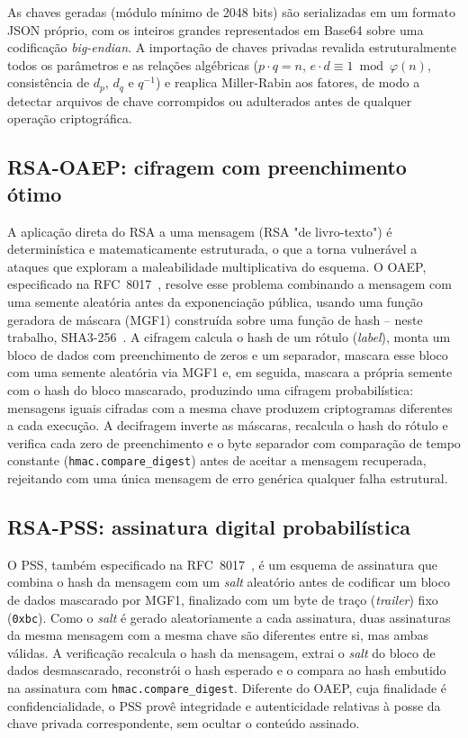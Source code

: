 \documentclass[conference]{IEEEtran}
\begin{document}
As chaves geradas (módulo mínimo de 2048 bits) são serializadas em um formato JSON próprio,
com os inteiros grandes representados em Base64 sobre uma codificação \textit{big-endian}. A
importação de chaves privadas revalida estruturalmente todos os parâmetros e as relações
algébricas ($p \cdot q = n$, $e \cdot d \equiv 1 \bmod \varphi(n)$, consistência de $d_p$,
$d_q$ e $q^{-1}$) e reaplica Miller-Rabin aos fatores, de modo a detectar arquivos de chave
corrompidos ou adulterados antes de qualquer operação criptográfica.

\subsection{RSA-OAEP: cifragem com preenchimento ótimo}

A aplicação direta do RSA a uma mensagem (RSA "de livro-texto") é determinística e
matematicamente estruturada, o que a torna vulnerável a ataques que exploram a maleabilidade
multiplicativa do esquema. O OAEP, especificado na RFC~8017~\cite{rfc8017}, resolve esse
problema combinando a mensagem com uma semente aleatória antes da exponenciação pública,
usando uma função geradora de máscara (MGF1) construída sobre uma função de hash -- neste
trabalho, SHA3-256~\cite{fips202}. A cifragem calcula o hash de um rótulo (\textit{label}),
monta um bloco de dados com preenchimento de zeros e um separador, mascara esse bloco com uma
semente aleatória via MGF1 e, em seguida, mascara a própria semente com o hash do bloco
mascarado, produzindo uma cifragem probabilística: mensagens iguais cifradas com a mesma chave
produzem criptogramas diferentes a cada execução. A decifragem inverte as máscaras, recalcula
o hash do rótulo e verifica cada zero de preenchimento e o byte separador com comparação de
tempo constante (\texttt{hmac.compare\_digest}) antes de aceitar a mensagem recuperada,
rejeitando com uma única mensagem de erro genérica qualquer falha estrutural.

\subsection{RSA-PSS: assinatura digital probabilística}

O PSS, também especificado na RFC~8017~\cite{rfc8017}, é um esquema de assinatura que combina
o hash da mensagem com um \textit{salt} aleatório antes de codificar um bloco de dados
mascarado por MGF1, finalizado com um byte de traço (\textit{trailer}) fixo (\texttt{0xbc}).
Como o \textit{salt} é gerado aleatoriamente a cada assinatura, duas assinaturas da mesma
mensagem com a mesma chave são diferentes entre si, mas ambas válidas. A verificação recalcula
o hash da mensagem, extrai o \textit{salt} do bloco de dados desmascarado, reconstrói o hash
esperado e o compara ao hash embutido na assinatura com \texttt{hmac.compare\_digest}. Diferente
do OAEP, cuja finalidade é confidencialidade, o PSS provê integridade e autenticidade
relativas à posse da chave privada correspondente, sem ocultar o conteúdo assinado.
\end{document}
